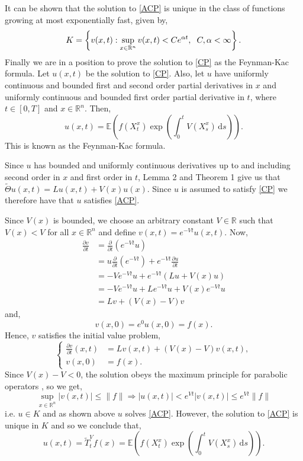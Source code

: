 \documentclass[a4paper,12pt,draft]{report}
\begin{document}
It can be shown that the solution to \eqref{ACP} is unique in the class of functions growing at most exponentially fast, given by,
$$
K = \left\{v(x, t) : \sup_{x \in \mathbb{R}^n}v(x, t) < Ce^{\alpha t}, \hspace{0.2cm} C, \alpha < \infty\right\}.
$$
Finally we are in a position to prove the solution to \eqref{CP} as the Feynman-Kac formula.
\theorem
{
Let $u(x, t)$ be the solution to \eqref{CP}.  Also, let $u$ have uniformly continuous and bounded first and second order partial derivatives in $x$ and uniformly continuous and bounded first order partial derivative in $t$, where $t \in [0, T]$ and $x \in \mathbb{R}^n$.  Then,
\begin{equation}
u(x, t) = \mathbb{E}\left(f(X_t^x)\exp\left(\int_0^t V(X_s^x)\,\mathrm{d}s\right)\right). \label{FCF}
\end{equation}
This is known as the Feynman-Kac formula.
}
\proof
{
Since $u$ has bounded and uniformly continuous derivatives up to and including second order in $x$ and first order in $t$, Lemma 2 and Theorem 1 give us that $\tilde{\Theta}u(x, t) = Lu(x, t) + V(x)u(x)$.  Since $u$ is assumed to satisfy \eqref{CP} we therefore have that $u$ satisfies \eqref{ACP}.

Since $V(x)$ is bounded, we choose an arbitrary constant $V \in \mathbb{R}$ such that $V(x) < V$ for all $x \in \mathbb{R}^n$ and define $v(x, t) = e^{-Vt}u(x, t)$.  Now,
\begin{align}
\frac{\partial v}{\partial t} & = \frac{\partial}{\partial t}(e^{-Vt}u)\nonumber\\
& = u\frac{\partial}{\partial t}(e^{-Vt}) + e^{-Vt}\frac{\partial u}{\partial t}\nonumber\\
& = -Ve^{-Vt}u + e^{-Vt}(Lu + V(x)u)\nonumber\\
& = -Ve^{-Vt}u + Le^{-Vt}u + V(x)e^{-Vt}u\nonumber\\
& = Lv + (V(x) - V)v\nonumber
\end{align}
and,
$$
v(x, 0) = e^0u(x, 0) = f(x).
$$
Hence, $v$ satisfies the initial value problem,
$$
\left\{
\begin{aligned}
\frac{\partial v}{\partial t}(x, t) & =  Lv(x, t) + (V(x) - V)v(x, t),\\ 
v(x, 0) & = f(x).
\end{aligned}
\right.
$$
Since $V(x) - V < 0$, the solution obeys the maximum principle for parabolic operators \cite{PW}, so we get,
$$
\sup_{x \in \mathbb{R}^n}|v(x, t)| \le \|f\| \Rightarrow |u(x, t)| < e^{Vt}|v(x, t)| \le e^{Vt}\|f\|
$$
i.e. $u \in K$ and as shown above $u$ solves \eqref{ACP}.  However, the solution to \eqref{ACP} is unique in $K$ and so we conclude that,
$$
u(x, t) = \tilde{T}_t^Vf(x) = \mathbb{E}\left(f(X_t^x)\exp\left(\int_0^t V(X_s^x)\,\mathrm{d}s\right)\right).
$$

\qedhere
}
\end{document}
